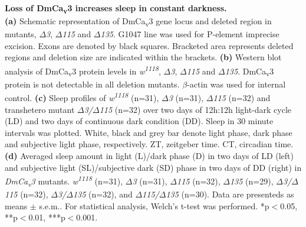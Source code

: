 \label{fig:S2}
\textbf{Loss of DmCa\textsubscript{v}3 increases sleep in constant darkness.}
\\
\textbf{(a)} Schematic representation of DmCa\textsubscript{v}3 gene locus and deleted region in mutants, \emph{$\Delta$3}, \emph{$\Delta$115} and \emph{$\Delta$135}.
G1047 line was used for P-element imprecise excision.
Exons are denoted by black squares.
Bracketed area represents deleted regions and deletion size are indicated within the brackets.
\textbf{(b)} Western blot analysis of DmCa\textsubscript{v}3 protein levels in \emph{w\textsuperscript{1118}}, \emph{$\Delta$3}, \emph{$\Delta$115} and \emph{$\Delta$135}.
DmCa\textsubscript{v}3 protein is not detectable in all deletion mutants.
$\beta$-actin was used for internal control.
\textbf{(c)} Sleep profiles of \emph{w\textsuperscript{1118}} (n=31), \emph{$\Delta$3} (n=31), \emph{$\Delta$115} (n=32) and transhetero mutant \emph{$\Delta$3/$\Delta$115} (n=32) over two days of 12h:12h light-dark cycle (LD) and two days of continuous dark condition (DD).
Sleep in 30 minute intervals was plotted.
White, black and grey bar denote light phase, dark phase and subjective light phase, respectively.
ZT, zeitgeber time.
CT, circadian time.
\textbf{(d)} Averaged sleep amount in light (L)/dark phase (D) in two days of LD (left) and subjective light (SL)/subjective dark (SD) phase in two days of DD (right) in \emph{DmCa\textsubscript{v}3} mutants.
\emph{w\textsuperscript{1118}} (n=31), \emph{$\Delta$3} (n=31), \emph{$\Delta$115} (n=32), \emph{$\Delta$135} (n=29), \emph{$\Delta$3/$\Delta$115} (n=32), \emph{$\Delta$3/$\Delta$135} (n=32), and \emph{$\Delta$115/$\Delta$135} (n=30).
Data are presenteds as means $\pm$ s.e.m..
For statistical analysis, Welch's t-test was performed.
*p$<$0.05, **p$<$0.01, ***p$<$0.001.
  
  
  